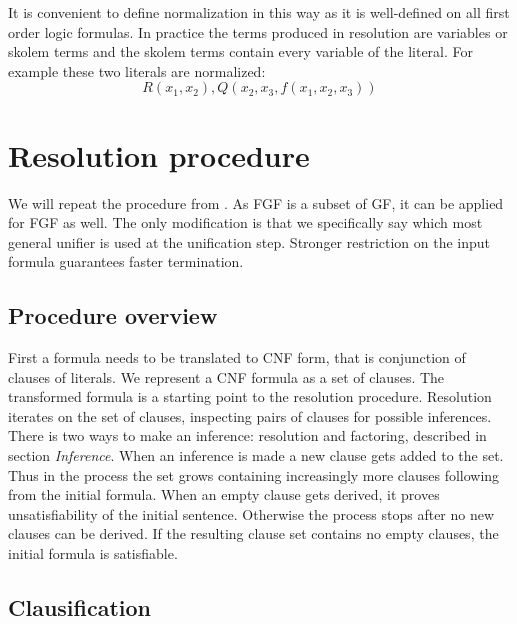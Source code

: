 \documentclass[english, shortabstract]{iithesis}
\theoremstyle{definition} \newtheorem{definition}{Definition}[chapter]
\theoremstyle{remark} \newtheorem{remark}[definition]{Observation}
\theoremstyle{plain} \newtheorem{theorem}[definition]{Theorem}
\theoremstyle{plain} \newtheorem{lemma}[definition]{Lemma}
\begin{document}
It is convenient to define normalization in this way as it is well-defined on all first order logic formulas.
In practice the terms produced in resolution are variables or skolem terms and the skolem terms contain every variable of the literal.
For example these two literals are normalized: $$R(x_1,x_2), Q(x_2, x_3, f(x_1,x_2, x_3))$$

\chapter{Resolution procedure}

We will repeat the procedure from \cite{resolution gf}. As FGF is a subset of GF, it can be applied for FGF as well.
The only modification is that we specifically say which most general unifier is used at the unification step.
Stronger restriction on the input formula guarantees faster termination. 

\section{Procedure overview}

First a formula needs to be translated to CNF form, that is conjunction of clauses of literals. 
We represent a CNF formula as a set of clauses. The transformed formula is a starting point to the resolution procedure.
Resolution iterates on the set of clauses, inspecting pairs of clauses for possible inferences.
There is two ways to make an inference: resolution and factoring, described in section \textit{Inference}.
When an inference is made a new clause gets added to the set.
Thus in the process the set grows containing increasingly more clauses following from the initial formula.
When an empty clause gets derived, it proves unsatisfiability of the initial sentence.
Otherwise the process stops after no new clauses can be derived. If the resulting 
clause set contains no empty clauses, the initial formula is satisfiable.

\section{Clausification}
\end{document}
